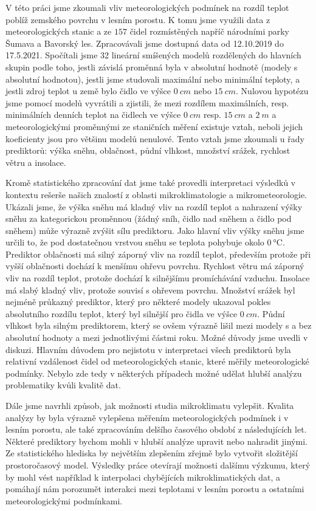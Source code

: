 V této práci jsme zkoumali vliv meteorologických podmínek na rozdíl teplot poblíž zemského povrchu v lesním porostu. K tomu jsme využili data z meteorologických stanic a ze $157$ čidel rozmístěných napříč národními parky Šumava a Bavorský les. Zpracovávali jsme dostupná data od 12.10.2019 do 17.5.2021. Spočítali jsme 32 lineární smíšených modelů rozdělených do hlavních skupin podle toho, jestli závislá proměnná byla v absolutní hodnotě (modely s absolutní hodnotou), jestli jsme studovali maximální nebo minimální teploty, a jestli zdroj teplot u země bylo čidlo ve výšce $\SI{0}{cm}$ nebo $\SI{15}{cm}$. Nulovou hypotézu jsme pomocí modelů vyvrátili a zjistili, že mezi rozdílem maximálních, resp. minimálních denních teplot na čidlech ve výšce $\SI{0}{cm}$ resp. $\SI{15}{cm}$ a $\SI{2}{m}$ a meteorologickými proměnnými ze staničních měření existuje vztah, neboli jejich koeficienty jsou pro většinu modelů nenulové. Tento vztah jsme zkoumali u řady prediktorů: výška sněhu, oblačnost, půdní vlhkost, množství srážek, rychlost větru a insolace.

Kromě statistického zpracování dat jsme také provedli interpretaci výsledků v kontextu rešerše našich znalostí z oblasti mikroklimatologie a mikrometeorologie. Ukázali jsme, že výška sněhu má kladný vliv na rozdíl teplot a nahrazení výšky sněhu za kategorickou proměnnou (žádný sníh, čidlo nad sněhem a čidlo pod sněhem) může výrazně zvýšit sílu prediktoru. Jako hlavní vliv výšky sněhu jsme určili to, že pod dostatečnou vrstvou sněhu se teplota pohybuje okolo $\SI{0}{\celsius}$. Prediktor oblačnosti má silný záporný vliv na rozdíl teplot, především protože při vyšší oblačnosti dochází k menšímu ohřevu povrchu. Rychlost větru má záporný vliv na rozdíl teplot, protože dochází k silnějšímu promíchávání vzduchu. Insolace má slabý kladný vliv, protože souvisí s ohřevem povrchu. Množství srážek byl nejméně průkazný prediktor, který pro některé modely ukazoval pokles absolutního rozdílu teplot, který byl silnější pro čidla ve výšce $\SI{0}{cm}$. Půdní vlhkost byla silným prediktorem, který se ovšem výrazně lišil mezi modely s a bez absolutní hodnoty a mezi jednotlivými částmi roku. Možné důvody jsme uvedli v diskuzi. Hlavním důvodem pro nejistotu v interpretaci všech prediktorů byla relativní vzdálenost čidel od meteorologických stanic, které měřily meteorologické podmínky. Nebylo zde tedy v některých případech možné udělat hlubší analýzu problematiky kvůli kvalitě dat.

Dále jsme navrhli způsob, jak možnosti studia mikroklimatu vylepšit. Kvalita analýzy by byla výrazně vylepšena měřením meteorologických podmínek i v lesním porostu, ale také zpracováním delšího časového období z následujících let. Některé prediktory bychom mohli v hlubší analýze upravit nebo nahradit jinými. Ze statistického hlediska by největším zlepšením zřejmě bylo vytvořit složitější prostoročasový model. Výsledky práce otevírají možnosti dalšímu výzkumu, který by mohl vést například k interpolaci chybějících mikroklimatických dat, a pomáhají nám porozumět interakci mezi teplotami v lesním porostu a ostatními meteorologickými podmínkami.
